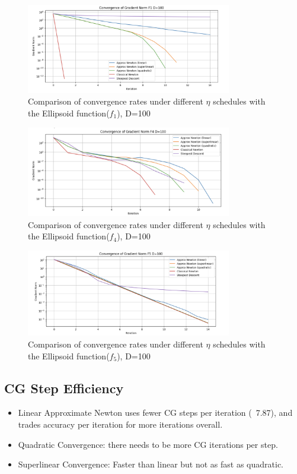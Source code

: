 \documentclass[12pt]{article}
\begin{document}
\begin{figure}[h]
    \centering
    \includegraphics[width=0.8\textwidth]{pics/h3-1}
    \caption{Comparison of convergence rates under different $\eta$ schedules with the Ellipsoid function($f_1$), D=100}
    \label{fig:f1}
\end{figure}

\begin{figure}[h]
    \centering
    \includegraphics[width=0.8\textwidth]{pics/h3-4}
    \caption{Comparison of convergence rates under different $\eta$ schedules with the Ellipsoid function($f_4$), D=100}
    \label{fig:f4}
\end{figure}

\begin{figure}[h]
    \centering
    \includegraphics[width=0.8\textwidth]{pics/h3-5}
    \caption{Comparison of convergence rates under different $\eta$ schedules with the Ellipsoid function($f_5$), D=100}
    \label{fig:f5}
\end{figure}



\subsection{CG Step Efficiency}
\begin{itemize}
    \item Linear Approximate Newton uses fewer CG steps per iteration (~7.87), and trades accuracy per iteration for more iterations overall.
    \item Quadratic Convergence: there needs to be more CG iterations per step.
    \item Superlinear Convergence: Faster than linear but not as fast as quadratic.
\end{itemize}
\end{document}

